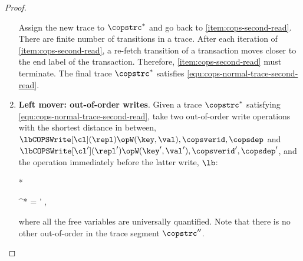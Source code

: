 \begin{proof}
\begin{enumerate}
    Assign the new trace to \( \copstrc^* \) and go back to \cref{item:cops-second-read}.
    There are finite number of transitions in a trace.
    After each iteration of \cref{item:cops-second-read}, a re-fetch transition of a transaction moves closer 
    to the end label of the transaction.
    Therefore, \cref{item:cops-second-read} must terminate.
    The final trace \( \copstrc^* \) satisfies \cref{equ:cops-normal-trace-second-read}.

\item{\textbf{Left mover: out-of-order writes}.} \label{item:cops-write}
    Given a trace \( \copstrc^* \) satisfying \cref{equ:cops-normal-trace-second-read},
    take two out-of-order write operations with the shortest distance in between,
    \( \lbCOPSWrite[\cl](\repl){\opW(\key,\val), \copsverid, \copsdep } \) and
    \( \lbCOPSWrite[\cl'](\repl'){\opW(\key',\val'), \copsverid', \copsdep' } \),
    and the operation immediately before the latter write, \( \lb \):
    \begin{Formulae}*
    \begin{Formula}
        \copstrc^* = 
        \land \copsverid' \copsveridleq \copsverid ,
    \end{Formula}
    \end{Formulae}
    where all the free variables are universally quantified.
    Note that there is no other out-of-order in the trace segment \( \copstrc'' \).


\end{enumerate}
\end{proof}
